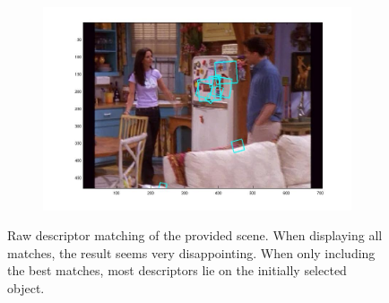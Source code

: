 \documentclass{paper}
\begin{document}
\begin{figure}
\begin{subfigure}[b]{0.7\textwidth}
  \end{subfigure}
    \begin{subfigure}[b]{0.7\textwidth}    
    \includegraphics[width=\textwidth]{raw_desc_matching_topten}
  \end{subfigure}
\caption{Raw descriptor matching of the provided scene. When displaying all matches,
the result seems very disappointing. When only including the best matches, most 
descriptors lie on the initially selected object.}
\label{fig:raw_desc_match}
\end{figure}
\end{document}
